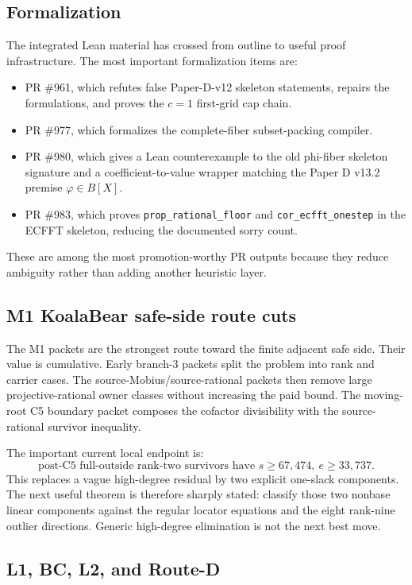 \documentclass[a4paper,11pt]{amsart}
\begin{document}
\subsection{Formalization}

The integrated Lean material has crossed from outline to useful proof
infrastructure.  The most important formalization items are:
\begin{itemize}
\item PR \#961, which refutes false Paper-D-v12 skeleton statements, repairs
the formulations, and proves the \(c=1\) first-grid cap chain.
\item PR \#977, which formalizes the complete-fiber subset-packing compiler.
\item PR \#980, which gives a Lean counterexample to the old phi-fiber skeleton
signature and a coefficient-to-value wrapper matching the Paper D v13.2
premise \(\varphi\in B[X]\).
\item PR \#983, which proves \texttt{prop\_rational\_floor} and
\texttt{cor\_ecfft\_onestep} in the ECFFT skeleton, reducing the documented
sorry count.
\end{itemize}
These are among the most promotion-worthy PR outputs because they reduce
ambiguity rather than adding another heuristic layer.

\subsection{M1 KoalaBear safe-side route cuts}

The M1 packets are the strongest route toward the finite adjacent safe side.
Their value is cumulative.  Early branch-3 packets split the problem into
rank and carrier cases.  The source-Mobius/source-rational packets then remove
large projective-rational owner classes without increasing the paid bound.  The
moving-root C5 boundary packet composes the cofactor divisibility with the
source-rational survivor inequality.

The important current local endpoint is:
\[
        \text{post-C5 full-outside rank-two survivors have }
        s\ge 67{,}474,\ e\ge 33{,}737.
\]
This replaces a vague high-degree residual by two explicit one-slack
components.  The next useful theorem is therefore sharply stated: classify
those two nonbase linear components against the regular locator equations and
the eight rank-nine outlier directions.  Generic high-degree elimination is not
the next best move.

\subsection{L1, BC, L2, and Route-D}
\end{document}
